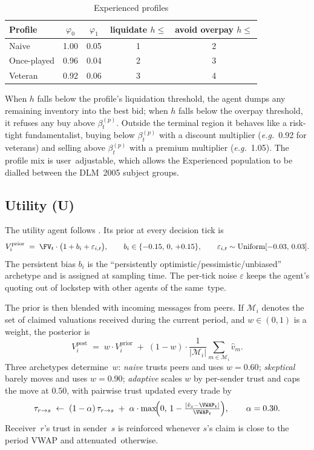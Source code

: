 \begin{table}[h]
\centering
\small
\caption{Experienced profiles}
\label{tab:exp}
\begin{tabular}{l c c c c}
\toprule
Profile & $\varphi_0$ & $\varphi_1$ & liquidate $h\le$ & avoid overpay $h\le$ \\
\midrule
Naive        & 1.00 & 0.05 & 1 & 2 \\
Once-played  & 0.96 & 0.04 & 2 & 3 \\
Veteran      & 0.92 & 0.06 & 3 & 4 \\
\bottomrule
\end{tabular}
\end{table}

When $h$ falls below the profile's liquidation threshold, the agent
dumps any remaining inventory into the best bid; when $h$ falls
below the overpay threshold, it refuses any buy above
$\beta_t^{(p)}$. Outside the terminal region it behaves like a
risk-tight fundamentalist, buying below $\beta_t^{(p)}$ with a
discount multiplier (\emph{e.g.\/}~0.92 for veterans) and selling
above $\beta_t^{(p)}$ with a premium multiplier (\emph{e.g.\/}~1.05).
The profile mix is user~adjustable, which allows the Experienced
population to be dialled between the DLM~2005 subject groups.

\subsection{Utility (U)}

The utility agent follows \citet{lopezlira2025llm}. Its prior at
every decision tick is
\begin{equation}
V_i^{\text{prior}}\;=\;\FV_t\cdot\bigl(1+b_i+\varepsilon_{i,t}\bigr),\qquad
b_i\in\{-0.15,\,0,\,+0.15\},\qquad
\varepsilon_{i,t}\sim\text{Uniform}[-0.03,\,0.03].
\label{eq:util_prior}
\end{equation}
The persistent bias $b_i$ is the ``persistently
optimistic/pessimistic/unbiased'' archetype and is assigned at
sampling time. The per-tick noise $\varepsilon$ keeps the agent's
quoting out of lockstep with other agents of the same~type.

The prior is then blended with incoming messages from peers. If
$\mathcal{M}_i$ denotes the set of claimed valuations received
during the current period, and $w\in(0,1)$ is a weight, the
posterior is
\begin{equation}
V_i^{\text{post}} \;=\; w\cdot V_i^{\text{prior}}
\;+\;(1-w)\cdot\frac{1}{|\mathcal{M}_i|}\sum_{m\in\mathcal{M}_i}\hat v_m.
\label{eq:blend}
\end{equation}
Three archetypes determine~$w$: \emph{naive} trusts peers and
uses $w=0.60$; \emph{skeptical} barely moves and uses $w=0.90$;
\emph{adaptive} scales $w$ by per-sender trust and caps the move at
$0.50$, with pairwise trust updated every trade by
\begin{equation}
\tau_{r\to s}\;\leftarrow\;(1-\alpha)\,\tau_{r\to s}
\;+\;\alpha\cdot\max\!\Bigl(0,\,1-\tfrac{|\hat v_s-\VWAP_t|}{\VWAP_t}\Bigr),\qquad
\alpha=0.30.
\label{eq:trust}
\end{equation}
Receiver~$r$'s trust in sender~$s$ is reinforced whenever $s$'s
claim is close to the period VWAP and attenuated~otherwise.

